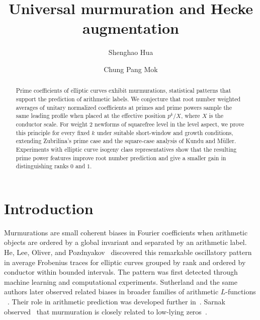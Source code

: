 \documentclass[12pt,reqno]{amsart}
\numberwithin{equation}{section}
\theoremstyle{plain}
\theoremstyle{definition}
\theoremstyle{remark}
\begin{document}
\title[Universal Murmuration]{Universal murmuration and Hecke augmentation}
\author{Shenghao Hua}
\address[1]{Shanghai Institute for Mathematics and Interdisciplinary Sciences (SIMIS), Shanghai, 200433, China}
\address[2]{Research Institute of Intelligent Complex Systems, Fudan University, Shanghai, 200433, China}

\author{Chung Pang Mok}
\address[1]{Shanghai Institute for Mathematics and Interdisciplinary Sciences (SIMIS), Shanghai, 200433, China}

\begin{abstract}
Prime coefficients of elliptic curves exhibit murmurations, statistical patterns that support the prediction of arithmetic labels.
We conjecture that root number weighted averages of unitary normalized coefficients at primes and prime powers sample the same leading profile when placed at the effective position $p^k/X$,
where $X$ is the conductor scale.
For weight $2$ newforms of squarefree level in the level aspect, we prove this principle for every fixed $k$ under suitable short-window and growth conditions, extending Zubrilina's prime case and the square-case analysis of Kundu and M\"uller.
Experiments with elliptic curve isogeny class representatives show that the resulting prime power features improve root number prediction and give a smaller gain in distinguishing ranks $0$ and $1$.
\end{abstract}


\maketitle

\section{Introduction}

Murmurations are small coherent biases in Fourier coefficients when arithmetic objects are ordered by a global invariant and separated by an arithmetic label.
He, Lee, Oliver, and Pozdnyakov~\cite{HeLeeOliverPozdnyakov2025} discovered this remarkable oscillatory pattern in average Frobenius traces for elliptic curves grouped by rank and ordered by conductor within bounded intervals.
The pattern was first detected through machine learning and computational experiments.
Sutherland and the same authors later observed related biases in broader families of arithmetic $L$-functions
~\cite{Sutherland2022,HeLeeOliverPozdnyakov2025}.
Their role in arithmetic prediction was developed further
in~\cite{HeLeeOliverPozdnyakov2026,Pozdnyakov2024}.
Sarnak observed~\cite{Sarnak2023} that murmuration is closely related to low-lying zeros~\cite{IwaniecLuoSarnak2000}.
\end{document}
